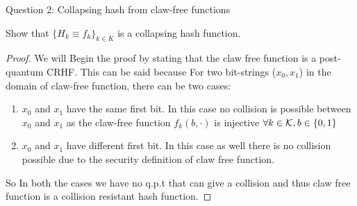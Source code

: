 \begin{solution}{Question 2: Collapsing hash from claw-free functions}\label{ques:x}
    \begin{question}
    Show that $\{H_k \equiv f_k\}_{k\in K}$ is a collapsing hash function.
    \end{question}
    \tcblower{}
    \begin{proof}
    We will Begin the proof by stating that the claw free function is a post-quantum CRHF. This can be said because For two bit-strings ($x_0,x_1$) in the domain of claw-free function, there can be two cases: \begin{enumerate}
        \item $x_0$ and $x_1$ have the same first bit. In this case no collision is possible between $x_0$ and $x_1$ as the claw-free function $f_k(b,\cdot)$ is injective $\forall k \in \mathcal{K}, b \in \{0,1\}$
        \item $x_0$ and $x_1$ have different first bit. In this case as well there is no collision possible due to the security definition of claw free function.
    \end{enumerate}

    So In both the cases we have no q.p.t that can give a collision and thus claw free function is a collision resistant hash function.

    
    
    \end{proof}
\end{solution}
